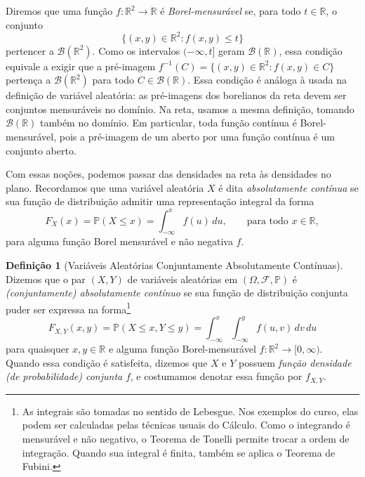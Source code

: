 \documentclass[12pt,portuguese]{article}
\theoremstyle{definition}
\newtheorem{definition}[definition]{Definição}
\theoremstyle{plainexercise}
\theoremstyle{starredexercise}
\theoremstyle{definition}
\begin{document}
Diremos que uma função $f:\mathbb{R}^2\to\mathbb{R}$ é
\emph{Borel-mensurável} se, para todo $t \in \mathbb{R}$, o conjunto
\[
  \{(x,y) \in \mathbb{R}^2 : f(x,y) \leqslant t\}
\]
pertencer a $\mathscr{B}(\mathbb{R}^2)$. Como os intervalos $(-\infty,t]$
geram $\mathscr{B}(\mathbb{R})$, essa condição equivale a exigir que a
pré-imagem $f^{-1}(C) = \{(x,y) \in \mathbb{R}^2 : f(x,y) \in C\}$
pertença a $\mathscr{B}(\mathbb{R}^2)$ para todo
$C \in \mathscr{B}(\mathbb{R})$. Essa condição é análoga à usada na
definição de variável aleatória: as pré-imagens dos borelianos da reta
devem ser conjuntos mensuráveis no domínio. Na reta, usamos a mesma
definição, tomando $\mathscr{B}(\mathbb{R})$ também no domínio.
Em particular, toda função
contínua é Borel-mensurável, pois a pré-imagem de um aberto por uma função
contínua é um conjunto aberto.

Com essas noções, podemos passar das densidades na reta às densidades no plano.
Recordamos que uma variável aleatória $X$ é dita \emph{absolutamente contínua}
se sua função de distribuição admitir uma representação integral da forma
\[
  F_X(x) = \mathbb{P}(X \leqslant x) = \int_{-\infty}^{x} f(u)\,du,
  \qquad \text{para todo } x \in \mathbb{R},
\]
para alguma função Borel mensurável e não negativa $f$.

\begin{definition}[Variáveis Aleatórias Conjuntamente Absolutamente Contínuas]\label{def:va-conjuntamente-continuas}
  Dizemos que o par $(X, Y)$ de variáveis aleatórias em
  $(\Omega, \mathcal{F}, \mathbb{P})$ é
  \emph{(conjuntamente) absolutamente contínuo} se sua função de distribuição
  conjunta puder ser expressa na forma\footnote{As integrais são tomadas no
  sentido de Lebesgue. Nos exemplos do curso, elas podem ser calculadas pelas
  técnicas usuais do Cálculo. Como o integrando é mensurável e não negativo,
  o Teorema de Tonelli permite trocar a ordem de integração. Quando sua
  integral é finita, também se aplica o Teorema de Fubini.}
  \begin{equation}\label{eq:distr-conjunta-integral}
    F_{X,Y}(x, y) = \mathbb{P}(X \leqslant x, Y \leqslant y)
    = \int_{-\infty}^{x} \int_{-\infty}^{y} f(u, v)\,dv\,du
  \end{equation}
  para quaisquer $x, y \in \mathbb{R}$ e alguma função Borel-mensurável
  $f : \mathbb{R}^2 \to [0, \infty)$. Quando essa condição é satisfeita,
  dizemos que $X$ e $Y$ possuem \emph{função densidade (de probabilidade)
  conjunta} $f$, e costumamos denotar essa função por $f_{X,Y}$.
\end{definition}
\end{document}
